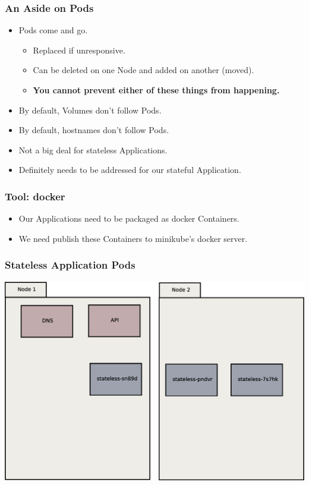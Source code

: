 \begin{frame}
    \frametitle{An Aside on Pods}
    \begin{itemize}
        \item Pods come and go.\pause
        \begin{itemize}
            \item Replaced if unresponsive.\pause
            \item Can be deleted on one Node and added on another (moved).\pause
            \item \textbf{You cannot prevent either of these things from happening.}\pause
        \end{itemize}
        \item By default, Volumes don't follow Pods.\pause
        \item By default, hostnames don't follow Pods.\pause
        \item Not a big deal for stateless Applications.\pause
        \item Definitely needs to be addressed for our stateful Application.
    \end{itemize}
\end{frame}

\begin{frame}
    \frametitle{Tool: docker\footnotemark}
    \begin{itemize}
        \item Our Applications need to be packaged as docker Containers.
        \item We need publish these Containers to minikube's docker server.
    \end{itemize}
\end{frame}

\begin{frame}
    \frametitle{Stateless Application Pods}
    \includegraphics[width=\textwidth,height=0.85\textheight,keepaspectratio]{graphics/02-statelessAppPods.eps}
\end{frame}

